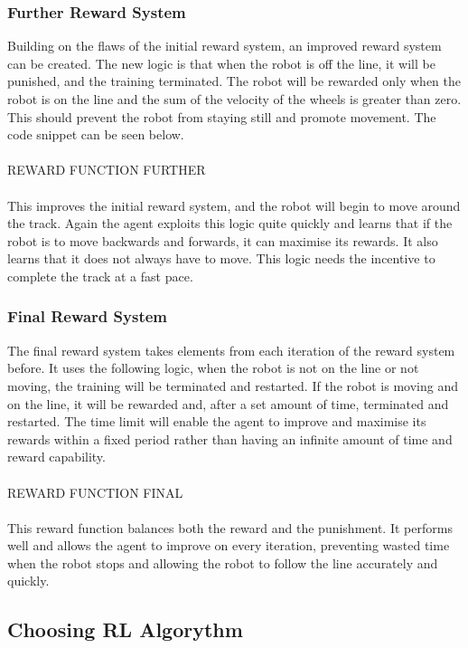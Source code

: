 \documentclass[12pt]{article}
\begin{document}
\subsubsection{Further Reward System}

Building on the flaws of the initial reward system, an improved reward system can be created. The new logic is that when the robot is off the line, it will be punished, and the training terminated. The robot will be rewarded only when the robot is on the line and the sum of the velocity of the wheels is greater than zero. This should prevent the robot from staying still and promote movement. The code snippet can be seen below.
\\\\
REWARD FUNCTION FURTHER
\\\\
This improves the initial reward system, and the robot will begin to move around the track. Again the agent exploits this logic quite quickly and learns that if the robot is to move backwards and forwards, it can maximise its rewards. It also learns that it does not always have to move. This logic needs the incentive to complete the track at a fast pace.


\subsubsection{Final Reward System} 

The final reward system takes elements from each iteration of the reward system before. It uses the following logic, when the robot is not on the line or not moving, the training will be terminated and restarted. If the robot is moving and on the line, it will be rewarded and, after a set amount of time, terminated and restarted. The time limit will enable the agent to improve and maximise its rewards within a fixed period rather than having an infinite amount of time and reward capability.
\\\\
REWARD FUNCTION FINAL
\\\\
This reward function balances both the reward and the punishment. It performs well and allows the agent to improve on every iteration, preventing wasted time when the robot stops and allowing the robot to follow the line accurately and quickly.

\subsection{Choosing RL Algorythm}
\end{document}
